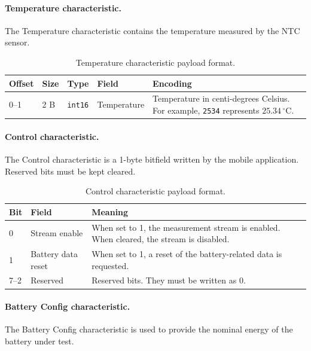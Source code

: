 \paragraph{Temperature characteristic.}
The Temperature characteristic contains the temperature measured by the NTC sensor.

\begin{table}[H]
	\centering
	\small
	\caption{Temperature characteristic payload format.}
	\label{tab:wattmate_temperature_payload}
	\begin{tabular}{p{} p{} p{} p{} p{}}
		\toprule
		\textbf{Offset} & \textbf{Size} & \textbf{Type} & \textbf{Field} & \textbf{Encoding} \\
		\midrule
		0--1 &
		2 B &
		\texttt{int16} &
		Temperature &
		Temperature in centi-degrees Celsius. For example, \texttt{2534} represents \(25.34\,^{\circ}\mathrm{C}\). \\
		\bottomrule
	\end{tabular}
\end{table}

\paragraph{Control characteristic.}
The Control characteristic is a 1-byte bitfield written by the mobile application. 
Reserved bits must be kept cleared.

\begin{table}[H]
	\centering
	\small
	\caption{Control characteristic payload format.}
	\label{tab:wattmate_control_payload}
	\begin{tabular}{p{} p{} p{}}
		\toprule
		\textbf{Bit} & \textbf{Field} & \textbf{Meaning} \\
		\midrule
		0 &
		Stream enable &
		When set to 1, the measurement stream is enabled. When cleared, the stream is disabled. \\
		
		1 &
		Battery data reset &
		When set to 1, a reset of the battery-related data is requested. \\
		
		7--2 &
		Reserved &
		Reserved bits. They must be written as 0. \\
		\bottomrule
	\end{tabular}
\end{table}

\paragraph{Battery Config characteristic.}
The Battery Config characteristic is used to provide the nominal energy of the battery under test.

